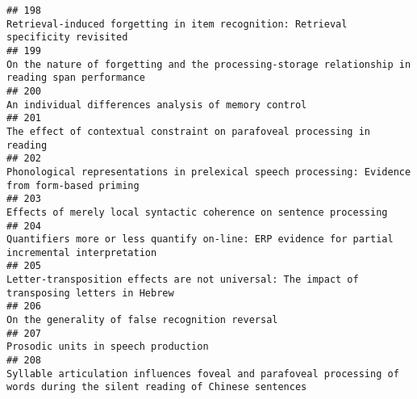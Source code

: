 \documentclass[
  english,
  man]{apa6}
\begin{document}
\begin{verbatim}
## 198                                                                                                                                                        Retrieval-induced forgetting in item recognition: Retrieval specificity revisited
## 199                                                                                                                                          On the nature of forgetting and the processing-storage relationship in reading span performance
## 200                                                                                                                                                                                     An individual differences analysis of memory control
## 201                                                                                                                                                                  The effect of contextual constraint on parafoveal processing in reading
## 202                                                                                                                                           Phonological representations in prelexical speech processing: Evidence from form-based priming
## 203                                                                                                                                                                       Effects of merely local syntactic coherence on sentence processing
## 204                                                                                                                                           Quantifiers more or less quantify on-line: ERP evidence for partial incremental interpretation
## 205                                                                                                                                              Letter-transposition effects are not universal: The impact of transposing letters in Hebrew
## 206                                                                                                                                                                                          On the generality of false recognition reversal
## 207                                                                                                                                                                                                      Prosodic units in speech production
## 208                                                                                                                Syllable articulation influences foveal and parafoveal processing of words during the silent reading of Chinese sentences

\end{verbatim}
\end{document}

